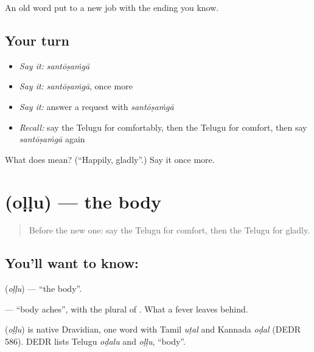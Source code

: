 \begin{grammarlens}[title={What you've built}]
An old word put to a new job with the ending you know.
\end{grammarlens}

\subsection*{Your turn}
\begin{itemize}
\raggedright
  \item \emph{Say it:} \emph{santōṣaṁgā}
  \item \emph{Say it:} \emph{santōṣaṁgā}, once more
  \item \emph{Say it:} answer a request with \emph{santōṣaṁgā}
  \item \emph{Recall:} say the Telugu for comfortably, then the Telugu for comfort, then say \emph{santōṣaṁgā} again
\end{itemize}

\begin{tcolorbox}[breakable,colback=teal!4,colframe=teal!35!black,title={Before you move on}]
What does  mean? (\textquotedblleft{}Happily, gladly\textquotedblright{}.) Say it once more.
\end{tcolorbox}
\section[\texorpdfstring{\te{ఒళ్ళు} (oḷḷu)}{ఒళ్ళు (oḷḷu)}]{ (oḷḷu) — the body}

\label{lesson:TE-C93-body}



\begin{quote}
Before the new one: say the Telugu for comfort, then the Telugu for gladly.
\end{quote}

\subsection*{You'll want to know: }
\textbf{} (\emph{oḷḷu}) — \textquotedblleft{}the body\textquotedblright{}.

\textbf{ } — \textquotedblleft{}body aches\textquotedblright{}, with the plural of \textbf{}. What a fever leaves behind.

\begin{cousinweb}
\textbf{} (\emph{oḷḷu}) is native Dravidian, one word with Tamil \emph{uṭal} and Kannada \emph{oḍal} (DEDR 586). DEDR lists Telugu \emph{oḍalu} and \emph{oḷḷu}, \textquotedblleft{}body\textquotedblright{}.
\end{cousinweb}

